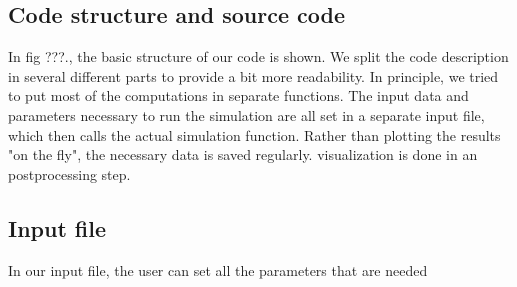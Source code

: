 \documentclass[11pt]{article}
\begin{document}
\begin{appendix}
\section{Code structure and source code}
In fig ???., the basic structure of our code is shown. We split the code description in several different parts to provide a bit more readability. In principle, we tried to put most of the computations in separate functions. The input data and parameters necessary to run the simulation are all set in a separate input file, which then calls the actual simulation function. Rather than plotting the results "on the fly", the necessary data is saved regularly. visualization is done in an postprocessing step.
\subsection{Input file}
In our input file, the user can set all the parameters that are needed

\end{appendix}
\end{document}
